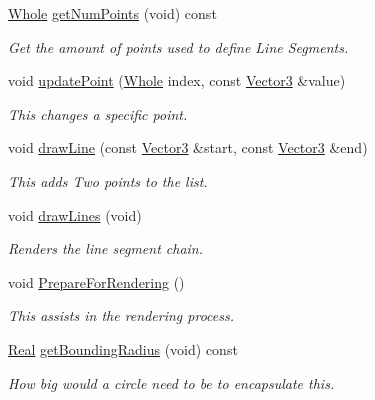 \begin{DoxyCompactItemize}
\hyperlink{namespacephys_a460f6bc24c8dd347b05e0366ae34f34a}{Whole} \hyperlink{classphys_1_1LineGroup_a32e14111a18318fd17aa503b1d3cfe8c}{getNumPoints} (void) const 
\begin{DoxyCompactList}\small\item\em Get the amount of points used to define Line Segments. \item\end{DoxyCompactList}\item 
void \hyperlink{classphys_1_1LineGroup_a3d98d0eb4fd15ac136d4649913dd80c8}{updatePoint} (\hyperlink{namespacephys_a460f6bc24c8dd347b05e0366ae34f34a}{Whole} index, const \hyperlink{classphys_1_1Vector3}{Vector3} \&value)
\begin{DoxyCompactList}\small\item\em This changes a specific point. \item\end{DoxyCompactList}\item 
void \hyperlink{classphys_1_1LineGroup_a141db62ea17d94b9bce421e5df5a8d89}{drawLine} (const \hyperlink{classphys_1_1Vector3}{Vector3} \&start, const \hyperlink{classphys_1_1Vector3}{Vector3} \&end)
\begin{DoxyCompactList}\small\item\em This adds Two points to the list. \item\end{DoxyCompactList}\item 
void \hyperlink{classphys_1_1LineGroup_ade1bb4f8e1164e1b8d7aeabbc970b79d}{drawLines} (void)
\begin{DoxyCompactList}\small\item\em Renders the line segment chain. \item\end{DoxyCompactList}\item 
void \hyperlink{classphys_1_1LineGroup_ab8d5c3c91dd16008429cc4cafed7f42f}{PrepareForRendering} ()
\begin{DoxyCompactList}\small\item\em This assists in the rendering process. \item\end{DoxyCompactList}\item 
\hyperlink{namespacephys_af7eb897198d265b8e868f45240230d5f}{Real} \hyperlink{classphys_1_1LineGroup_a9dbbd74f5256ee67454ef6ede752dc32}{getBoundingRadius} (void) const 
\begin{DoxyCompactList}\small\item\em How big would a circle need to be to encapsulate this. \item\end{DoxyCompactList}\end{DoxyCompactItemize}


